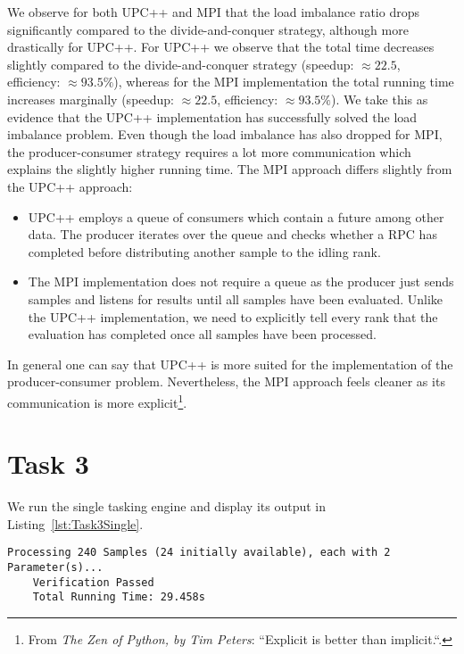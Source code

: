 \documentclass[11pt]{article}
\begin{document}
    We observe for both UPC++ and MPI that the load imbalance ratio drops
    significantly compared to the divide-and-conquer strategy, although more
    drastically for UPC++.
    For UPC++ we observe that the total time decreases slightly compared to
    the divide-and-conquer strategy (speedup: $\approx 22.5$, efficiency:
    $\approx 93.5\%$), whereas for the MPI implementation the total running
    time increases marginally (speedup: $\approx 22.5$, efficiency:
    $\approx 93.5\%$).
    We take this as evidence that the UPC++ implementation has successfully
    solved the load imbalance problem.
    Even though the load imbalance has also dropped for MPI, the
    producer-consumer strategy requires a lot more communication which explains
    the slightly higher running time.
    The MPI approach differs slightly from the UPC++ approach:
    \begin{itemize}
        \item UPC++ employs a queue of consumers which contain a future among
        other data.
        The producer iterates over the queue and checks whether a RPC has
        completed before distributing another sample to the idling rank.
        \item The MPI implementation does not require a queue as the
        producer just sends samples and listens for results until all
        samples have been evaluated.
        Unlike the UPC++ implementation, we need to explicitly tell every
        rank that the evaluation has completed once all samples have been
        processed.
    \end{itemize}
    In general one can say that UPC++ is more suited for the implementation
    of the producer-consumer problem.
    Nevertheless, the MPI approach feels cleaner as its communication is more
    explicit\footnote{From \emph{The Zen of Python, by Tim Peters}:
    ``Explicit is better than implicit.``.}.

    \section*{Task 3}
    \label{sec:Task3}

    We run the single tasking engine and display its output in
    Listing~\ref{lst:Task3Single}.

    \begin{lstlisting}[basicstyle=\tiny, frame=single, caption={Output from
    executing the single tasking engine.}, label={lst:Task3Single}]
    Processing 240 Samples (24 initially available), each with 2 Parameter(s)...
    Verification Passed
    Total Running Time: 29.458s
    \end{lstlisting}
\end{document}
